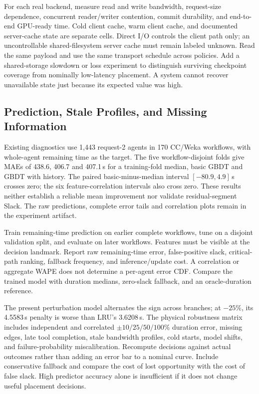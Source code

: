 \documentclass[sigplan,10pt,anonymous,nonacm]{acmart}
\begin{document}
For each real backend, measure read and write bandwidth, request-size
dependence, concurrent reader/writer contention, commit durability, and
end-to-end GPU-ready time. Cold client cache, warm client cache, and
documented server-cache state are separate cells. Direct I/O controls
the client path only; an uncontrollable shared-filesystem server cache
must remain labeled unknown. Read the same payload and use the same
transport schedule across policies. Add a shared-storage slowdown or
loss experiment to distinguish surviving checkpoint coverage from
nominally low-latency placement. A system cannot recover unavailable
state just because its expected value was high.

\FloatBarrier
\subsection{Prediction, Stale Profiles, and Missing Information}
\label{sec:eval-prediction}

Existing diagnostics use 1,443 request-2 agents in 170 CC/Weka workflows,
with whole-agent remaining time as the target. The five workflow-disjoint
folds give MAEs of 438.6, 406.7 and 407.1\,s for a training-fold median,
basic GBDT and GBDT with history. The paired basic-minus-median interval
$[-80.9,4.9]$\,s crosses zero; the six feature-correlation intervals also
cross zero. These results neither establish a reliable mean improvement
nor validate residual-segment Slack. The raw predictions, complete error
tails and correlation plots remain in the experiment artifact.

Train remaining-time prediction on earlier complete workflows, tune on
a disjoint validation split, and evaluate on later workflows. Features
must be visible at the decision landmark. Report raw remaining-time
error, false-positive slack, critical-path ranking, fallback frequency,
and inference/update cost. A correlation or aggregate WAPE does not
determine a per-agent error CDF. Compare the trained model with duration
medians, zero-slack fallback, and an oracle-duration reference.

The present perturbation model alternates the sign across branches;
at $-25\%$, its 4.5583\,s penalty is worse than LRU's 3.6208\,s.
The physical robustness matrix includes independent and correlated
$\pm10/25/50/100\%$ duration error, missing edges, late tool completion,
stale bandwidth profiles, cold starts, model shifts, and failure-probability
miscalibration. Recompute decisions against actual outcomes rather than
adding an error bar to a nominal curve. Include conservative fallback
and compare the cost of lost opportunity with the cost of false slack.
High predictor accuracy alone is insufficient if it does not change
useful placement decisions.
\end{document}
